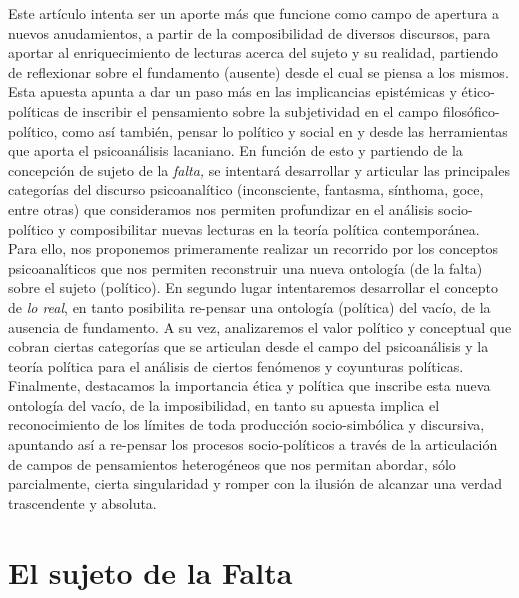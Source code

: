Este artículo intenta ser un aporte más que funcione como campo de apertura a nuevos anudamientos, a partir de la composibilidad de diversos discursos, para aportar al enriquecimiento de lecturas acerca del sujeto y su realidad, partiendo de reflexionar sobre el fundamento (ausente) desde el cual se piensa a los mismos. Esta apuesta apunta a dar un paso más en las implicancias epistémicas y ético-políticas de inscribir el pensamiento sobre la subjetividad en el campo filosófico-político, como así también, pensar lo político y social en y desde las herramientas que aporta el psicoanálisis lacaniano. En función de esto y partiendo de la concepción de sujeto de la \emph{falta,} se intentará desarrollar y articular las principales categorías del discurso psicoanalítico (inconsciente, fantasma, sínthoma, goce, entre otras) que consideramos nos permiten profundizar en el análisis socio-político y composibilitar nuevas lecturas en la teoría política contemporánea. Para ello, nos proponemos primeramente realizar un recorrido por los conceptos psicoanalíticos que nos permiten reconstruir una nueva ontología (de la falta) sobre el sujeto (político). En segundo lugar intentaremos desarrollar el concepto de \emph{lo real}, en tanto posibilita re-pensar una ontología (política) del vacío, de la ausencia de fundamento. A su vez, analizaremos el valor político y conceptual que cobran ciertas categorías que se articulan desde el campo del psicoanálisis y la teoría política para el análisis de ciertos fenómenos y coyunturas políticas. Finalmente, destacamos la importancia ética y política que inscribe esta nueva ontología del vacío, de la imposibilidad, en tanto su apuesta implica el reconocimiento de los límites de toda producción socio-simbólica y discursiva, apuntando así a re-pensar los procesos socio-políticos a través de la articulación de campos de pensamientos heterogéneos que nos permitan abordar, sólo parcialmente, cierta singularidad y romper con la ilusión de alcanzar una verdad trascendente y absoluta.

\section{El sujeto de la Falta}


